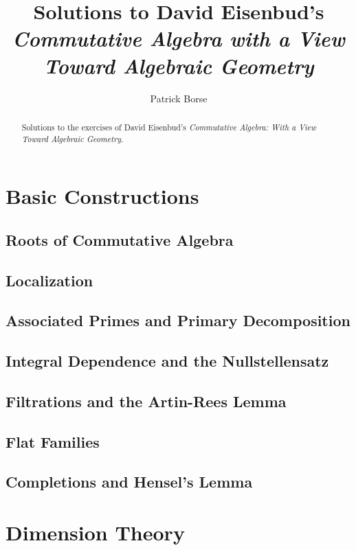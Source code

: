 \documentclass[oneside]{amsbook}
\title{Solutions to David Eisenbud's\\ \emph{Commutative Algebra with a View Toward Algebraic Geometry}}
\author{Patrick Borse}
\begin{document}
\begin{abstract}
Solutions to the exercises of David Eisenbud's \emph{Commutative Algebra: With a View Toward Algebraic Geometry}.
\end{abstract}

\maketitle

\tableofcontents

\part{Basic Constructions}
\chapter{Roots of Commutative Algebra}


\chapter{Localization}


\chapter{Associated Primes and Primary Decomposition}


\chapter{Integral Dependence and the Nullstellensatz}


\chapter{Filtrations and the Artin-Rees Lemma}


\chapter{Flat Families}


\chapter{Completions and Hensel's Lemma}


\part{Dimension Theory}
\setcounter{chapter}{8}
\end{document}
